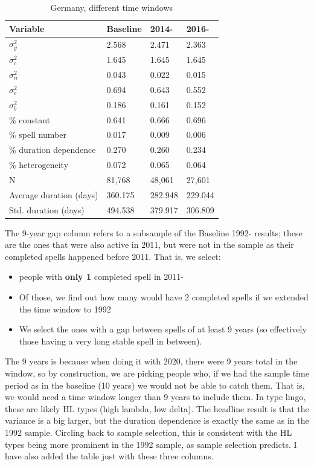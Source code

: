 \documentclass[12pt]{article}
\theoremstyle{definition}
\theoremstyle{remark}
\begin{document}
\begin{appendices}
\begin{table}[htbb!]\label{tab:results_ger_sample}
    \centering
    \caption{Germany, different time windows}
\begin{tabular}{llll}
\toprule
Variable & Baseline & 2014- & 2016- \\
\midrule
$\sigma^{2}_y$ & 2.568 & 2.471 & 2.363 \\
$\sigma^{2}_c$ & 1.645 & 1.645 & 1.645 \\
$\sigma^{2}_n$ & 0.043 & 0.022 & 0.015 \\
$\sigma^{2}_e$ & 0.694 & 0.643 & 0.552 \\
$\sigma^{2}_b$ & 0.186 & 0.161 & 0.152 \\
\midrule
\% constant & 0.641 & 0.666 & 0.696 \\
\% spell number & 0.017 & 0.009 & 0.006 \\
\% duration dependence & 0.270 & 0.260 & 0.234 \\
\% heterogeneity & 0.072 & 0.065 & 0.064 \\
\hline \hline
N & 81,768 & 48,061 & 27,601 \\
Average duration (days) & 360.175 & 282.948 & 229.044 \\
Std. duration (days) & 494.538 & 379.917 & 306.809 \\
\bottomrule
\end{tabular}
\end{table}



\textcolor{uv}{The 9-year gap column refers to a subsample of the Baseline 1992- results; these are the ones that were also active in 2011, but were not in the sample as their completed spells happened before 2011. That is, we select:
\begin{itemize}
    \item people with \textbf{only 1} completed spell in 2011-
    \item Of those, we find out how many would have 2 completed spells if we extended the time window to 1992
    \item We select the ones with a gap between spells of at least 9 years (so effectively those having a very long stable spell in between).
\end{itemize}
The 9 years is because when doing it with 2020, there were 9 years total in the window, so by construction, we are picking people who, if we had the sample time period as in the baseline (10 years) we would not be able to catch them. That is, we would need a time window longer than 9 years to include them. In type lingo, these are likely HL types (high lambda, low delta). The headline result is that the variance is a big larger, but the duration dependence is exactly the same as in the 1992 sample. Circling back to sample selection, this is consistent with the HL types being more prominent in the 1992 sample, as sample selection predicts. I have also added the table just with these three columns.}


\end{appendices}
\end{document}
